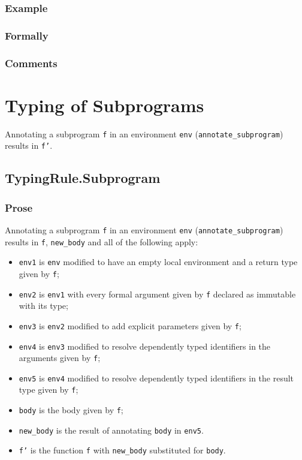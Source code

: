 \documentclass{book}
\begin{document}
\begin{itemize}
  \subsection{Example}



  \subsection{Formally}

  \subsection{Comments}

\chapter{Typing of Subprograms}

Annotating a subprogram \texttt{f} in an environment \texttt{env}
(\texttt{annotate\_subprogram}) results in \texttt{f'}.

\section{TypingRule.Subprogram \label{sec:TypingRule.Subprogram}}

  \subsection{Prose}
Annotating a subprogram \texttt{f} in an environment \texttt{env}
(\texttt{annotate\_subprogram}) results in \texttt{f}, \texttt{new\_body} and all of
the following apply:
 \begin{itemize}
   \item \texttt{env1} is \texttt{env} modified to have an empty local
     environment and a return type given by \texttt{f};
   \item \texttt{env2} is \texttt{env1} with every formal argument given by
     \texttt{f} declared as immutable with its type;
   \item \texttt{env3} is \texttt{env2} modified to add explicit parameters
     given by \texttt{f};
   \item \texttt{env4} is \texttt{env3} modified to resolve dependently typed
     identifiers in the arguments given by \texttt{f};
   \item \texttt{env5} is \texttt{env4} modified to resolve dependently typed
     identifiers in the result type given by \texttt{f};
   \item \texttt{body} is the body given by \texttt{f};
   \item \texttt{new\_body} is the result of annotating \texttt{body} in
     \texttt{env5}.
   \item \texttt{f'} is the function \texttt{f} with \texttt{new\_body} substituted for \texttt{body}.
 \end{itemize}
 \end{itemize}
\end{document}
